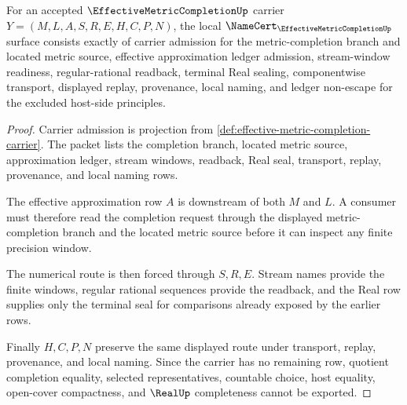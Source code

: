 \begin{theorem}
\label{thm:effective-metric-completion-namecert-obligations}
For an accepted $\EffectiveMetricCompletionUp$ carrier $Y=(M,L,A,S,R,E,H,C,P,N)$, the local $\NameCert_{\EffectiveMetricCompletionUp}$ surface consists exactly of carrier admission for the metric-completion branch and located metric source, effective approximation ledger admission, stream-window readiness, regular-rational readback, terminal Real sealing, componentwise transport, displayed replay, provenance, local naming, and ledger non-escape for the excluded host-side principles.
\end{theorem}
\begin{proof}
Carrier admission is projection from \autoref{def:effective-metric-completion-carrier}. The packet lists the completion branch, located metric source, approximation ledger, stream windows, readback, Real seal, transport, replay, provenance, and local naming rows.

The effective approximation row $A$ is downstream of both $M$ and $L$. A consumer must therefore read the completion request through the displayed metric-completion branch and the located metric source before it can inspect any finite precision window.

The numerical route is then forced through $S,R,E$. Stream names provide the finite windows, regular rational sequences provide the readback, and the Real row supplies only the terminal seal for comparisons already exposed by the earlier rows.

Finally $H,C,P,N$ preserve the same displayed route under transport, replay, provenance, and local naming. Since the carrier has no remaining row, quotient completion equality, selected representatives, countable choice, host equality, open-cover compactness, and $\RealUp$ completeness cannot be exported.
\end{proof}

